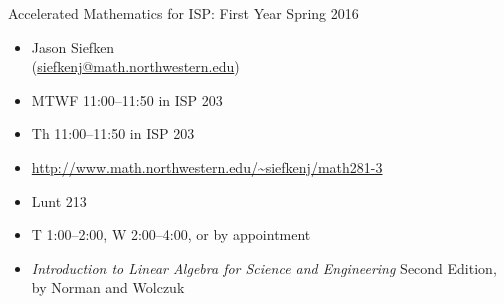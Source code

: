 \documentclass[12pt]{article}
\begin{document}
	{
		\begin{minipage}[t]{\textwidth}
			\color{deeppurple}
			\hfill Accelerated Mathematics for ISP: First Year
			\hfill Spring 2016

			\vspace{-8pt}
			\color{deeppurple}{\rule{\columnwidth}{3pt}}

			\vspace{.2cm}
		\end{minipage}
	}
	{
		\begin{minipage}[t]{.5\textwidth}
			\begin{itemize}[leftmargin=2cm, itemsep=0ex, parsep=.5ex, labelindent=-4ex, %
		  label={}]
				\item[{\sf\color{gray}{Instructor:}}] Jason Siefken\\ (\url{siefkenj@math.northwestern.edu})
				\item[{\sf\color{gray}{Class:}}] MTWF 11:00--11:50 in ISP 203
				\item[{\sf\color{gray}{Dicussion Section:}}] Th 11:00--11:50 in ISP 203
				\item[{\sf\color{gray}{Webpge:}}] {\footnotesize \url{http://www.math.northwestern.edu/~siefkenj/math281-3}}
			\end{itemize}
		\end{minipage}
		\begin{minipage}[t]{.5\textwidth}
			\begin{itemize}[leftmargin=2.5cm, itemsep=0ex, parsep=.5ex, labelindent=-4ex, %
		  label={}]
				\item[{\sf\color{gray}{Office:}}] Lunt 213
				\item[{\sf\color{gray}{Office Hours:}}] T 1:00--2:00, W 2:00--4:00, or by appointment
				\item[{\sf\color{gray}{Textbook:}}] {\small {\it Introduction to Linear Algebra
					for Science and Engineering} Second Edition, by Norman and Wolczuk}
			\end{itemize}
		\end{minipage}
		\vspace{.1cm}
		\color{deeppurple}{\hrule}
	}

	\vspace{.2cm}
	
\end{document}
